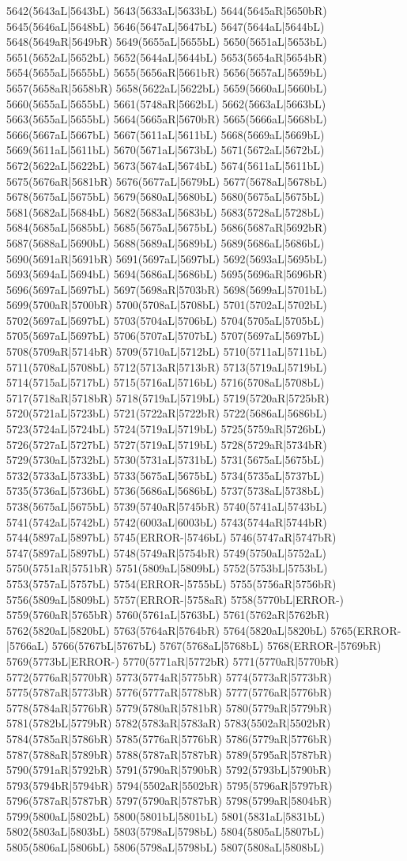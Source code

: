 5642(5643aL|5643bL) 5643(5633aL|5633bL) 5644(5645aR|5650bR) 5645(5646aL|5648bL) 5646(5647aL|5647bL) 5647(5644aL|5644bL) 5648(5649aR|5649bR) 5649(5655aL|5655bL) 5650(5651aL|5653bL) 5651(5652aL|5652bL) 5652(5644aL|5644bL) 5653(5654aR|5654bR) 5654(5655aL|5655bL) 5655(5656aR|5661bR) 5656(5657aL|5659bL) 5657(5658aR|5658bR) 5658(5622aL|5622bL) 5659(5660aL|5660bL) 5660(5655aL|5655bL) 5661(5748aR|5662bL) 5662(5663aL|5663bL) 5663(5655aL|5655bL) 5664(5665aR|5670bR) 5665(5666aL|5668bL) 5666(5667aL|5667bL) 5667(5611aL|5611bL) 5668(5669aL|5669bL) 5669(5611aL|5611bL) 5670(5671aL|5673bL) 5671(5672aL|5672bL) 5672(5622aL|5622bL) 5673(5674aL|5674bL) 5674(5611aL|5611bL) 5675(5676aR|5681bR) 5676(5677aL|5679bL) 5677(5678aL|5678bL) 5678(5675aL|5675bL) 5679(5680aL|5680bL) 5680(5675aL|5675bL) 5681(5682aL|5684bL) 5682(5683aL|5683bL) 5683(5728aL|5728bL) 5684(5685aL|5685bL) 5685(5675aL|5675bL) 5686(5687aR|5692bR) 5687(5688aL|5690bL) 5688(5689aL|5689bL) 5689(5686aL|5686bL) 5690(5691aR|5691bR) 5691(5697aL|5697bL) 5692(5693aL|5695bL) 5693(5694aL|5694bL) 5694(5686aL|5686bL) 5695(5696aR|5696bR) 5696(5697aL|5697bL) 5697(5698aR|5703bR) 5698(5699aL|5701bL) 5699(5700aR|5700bR) 5700(5708aL|5708bL) 5701(5702aL|5702bL) 5702(5697aL|5697bL) 5703(5704aL|5706bL) 5704(5705aL|5705bL) 5705(5697aL|5697bL) 5706(5707aL|5707bL) 5707(5697aL|5697bL) 5708(5709aR|5714bR) 5709(5710aL|5712bL) 5710(5711aL|5711bL) 5711(5708aL|5708bL) 5712(5713aR|5713bR) 5713(5719aL|5719bL) 5714(5715aL|5717bL) 5715(5716aL|5716bL) 5716(5708aL|5708bL) 5717(5718aR|5718bR) 5718(5719aL|5719bL) 5719(5720aR|5725bR) 5720(5721aL|5723bL) 5721(5722aR|5722bR) 5722(5686aL|5686bL) 5723(5724aL|5724bL) 5724(5719aL|5719bL) 5725(5759aR|5726bL) 5726(5727aL|5727bL) 5727(5719aL|5719bL) 5728(5729aR|5734bR) 5729(5730aL|5732bL) 5730(5731aL|5731bL) 5731(5675aL|5675bL) 5732(5733aL|5733bL) 5733(5675aL|5675bL) 5734(5735aL|5737bL) 5735(5736aL|5736bL) 5736(5686aL|5686bL) 5737(5738aL|5738bL) 5738(5675aL|5675bL) 5739(5740aR|5745bR) 5740(5741aL|5743bL) 5741(5742aL|5742bL) 5742(6003aL|6003bL) 5743(5744aR|5744bR) 5744(5897aL|5897bL) 5745(ERROR-|5746bL) 5746(5747aR|5747bR) 5747(5897aL|5897bL) 5748(5749aR|5754bR) 5749(5750aL|5752aL) 5750(5751aR|5751bR) 5751(5809aL|5809bL) 5752(5753bL|5753bL) 5753(5757aL|5757bL) 5754(ERROR-|5755bL) 5755(5756aR|5756bR) 5756(5809aL|5809bL) 5757(ERROR-|5758aR) 5758(5770bL|ERROR-) 5759(5760aR|5765bR) 5760(5761aL|5763bL) 5761(5762aR|5762bR) 5762(5820aL|5820bL) 5763(5764aR|5764bR) 5764(5820aL|5820bL) 5765(ERROR-|5766aL) 5766(5767bL|5767bL) 5767(5768aL|5768bL) 5768(ERROR-|5769bR) 5769(5773bL|ERROR-) 5770(5771aR|5772bR) 5771(5770aR|5770bR) 5772(5776aR|5770bR) 5773(5774aR|5775bR) 5774(5773aR|5773bR) 5775(5787aR|5773bR) 5776(5777aR|5778bR) 5777(5776aR|5776bR) 5778(5784aR|5776bR) 5779(5780aR|5781bR) 5780(5779aR|5779bR) 5781(5782bL|5779bR) 5782(5783aR|5783aR) 5783(5502aR|5502bR) 5784(5785aR|5786bR) 5785(5776aR|5776bR) 5786(5779aR|5776bR) 5787(5788aR|5789bR) 5788(5787aR|5787bR) 5789(5795aR|5787bR) 5790(5791aR|5792bR) 5791(5790aR|5790bR) 5792(5793bL|5790bR) 5793(5794bR|5794bR) 5794(5502aR|5502bR) 5795(5796aR|5797bR) 5796(5787aR|5787bR) 5797(5790aR|5787bR) 5798(5799aR|5804bR) 5799(5800aL|5802bL) 5800(5801bL|5801bL) 5801(5831aL|5831bL) 5802(5803aL|5803bL) 5803(5798aL|5798bL) 5804(5805aL|5807bL) 5805(5806aL|5806bL) 5806(5798aL|5798bL) 5807(5808aL|5808bL) 